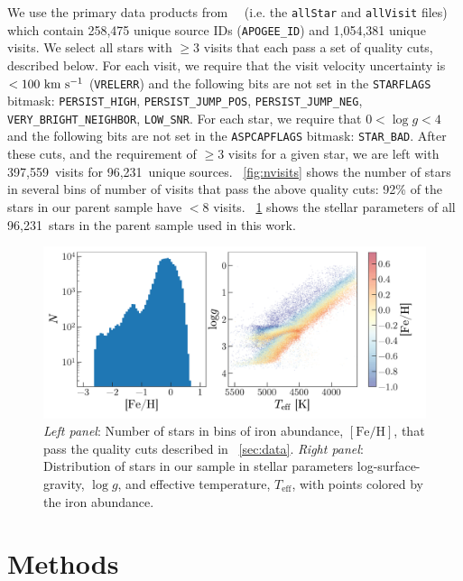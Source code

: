 \documentclass[modern, letterpaper]{aastex62}
\newcommand{\apogee}{\project{\acronym{APOGEE}}}
\newcommand{\DR}{\acronym{DR14}}
\newcommand{\logg}{\ensuremath{\log g}}
\newcommand{\Teff}{\ensuremath{T_{\textrm{eff}}}}
\newcommand{\nstars}{96,231}
\newcommand{\nvisits}{397,559}
\begin{document}
We use the primary data products from \apogee\ \DR\ (i.e. the \texttt{allStar}
and \texttt{allVisit} files) which contain 258,475 unique source IDs
(\texttt{APOGEE\_ID}) and 1,054,381 unique visits.
We select all stars with $\geq 3$ visits that each pass a set of quality cuts,
described below.
For each visit, we require that the visit velocity uncertainty is $< 100~\mathrm{km}~\mathrm{s}^{-1}$
(\texttt{VRELERR}) and the following bits are not set in the \texttt{STARFLAGS}
bitmask: \texttt{PERSIST\_HIGH}, \texttt{PERSIST\_JUMP\_POS},
\texttt{PERSIST\_JUMP\_NEG}, \texttt{VERY\_BRIGHT\_NEIGHBOR}, \texttt{LOW\_SNR}.
For each star, we require that $0 < \logg < 4$ and the following bits are not
set in the \texttt{ASPCAPFLAGS} bitmask: \texttt{STAR\_BAD}.
After these cuts, and the requirement of $\geq 3$ visits for a given star, we
are left with \nvisits\ visits for \nstars\ unique sources.
\figurename~\ref{fig:nvisits} shows the number of stars in several bins of
number of visits that pass the above quality cuts: 92\% of the stars in
our parent sample have $< 8$ visits.
\figurename~\ref{fig:loggteff} shows the stellar parameters of all \nstars\
stars in the parent sample used in this work.

\begin{figure}[h]
\begin{center}
\includegraphics[width=\textwidth]{logg_teff_feh.pdf}
\end{center}
\caption{%
\textit{Left panel}: Number of stars in bins of iron abundance,
$[\textrm{Fe}/\textrm{H}]$, that pass the quality cuts described in
\sectionname~\ref{sec:data}.
\textit{Right panel}: Distribution of stars in our sample in stellar parameters
log-surface-gravity, \logg, and effective temperature, \Teff, with points
colored by the iron abundance.
\label{fig:loggteff}
}
\end{figure}


\section{Methods}
\end{document}
